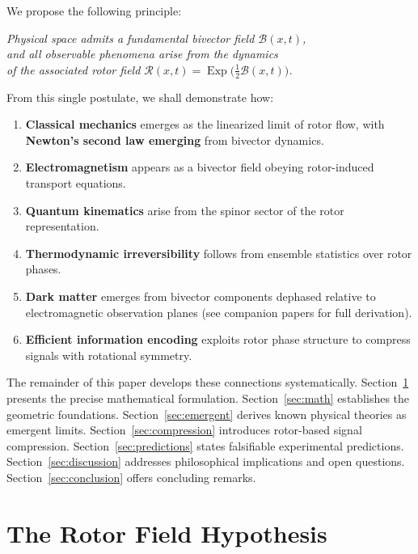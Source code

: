 \documentclass[11pt,a4paper]{article}
\newcommand{\Exp}{\operatorname{Exp}}
\newcommand{\Rotor}{\mathcal{R}}
\newcommand{\Biv}{\mathcal{B}}
\theoremstyle{definition}
\theoremstyle{plain}
\theoremstyle{remark}
\begin{document}
We propose the following principle:

\begin{center}
\textit{Physical space admits a fundamental bivector field $\Biv(x,t)$, \\
and all observable phenomena arise from the dynamics \\
of the associated rotor field $\Rotor(x,t)=\Exp\!\big(\tfrac{1}{2}\Biv(x,t)\big)$.}
\end{center}

From this single postulate, we shall demonstrate how:

\begin{enumerate}[leftmargin=*,itemsep=3pt]
  \item \textbf{Classical mechanics} emerges as the linearized limit of rotor flow, with \textbf{Newton's second law emerging} from bivector dynamics.
  \item \textbf{Electromagnetism} appears as a bivector field obeying rotor-induced transport equations.
  \item \textbf{Quantum kinematics} arise from the spinor sector of the rotor representation.
  \item \textbf{Thermodynamic irreversibility} follows from ensemble statistics over rotor phases.
  \item \textbf{Dark matter} emerges from bivector components dephased relative to electromagnetic observation planes (see companion papers for full derivation).
  \item \textbf{Efficient information encoding} exploits rotor phase structure to compress signals with rotational symmetry.
\end{enumerate}

The remainder of this paper develops these connections systematically. Section~\ref{sec:hypothesis} presents the precise mathematical formulation. Section~\ref{sec:math} establishes the geometric foundations. Section~\ref{sec:emergent} derives known physical theories as emergent limits. Section~\ref{sec:compression} introduces rotor-based signal compression. Section~\ref{sec:predictions} states falsifiable experimental predictions. Section~\ref{sec:discussion} addresses philosophical implications and open questions. Section~\ref{sec:conclusion} offers concluding remarks.

\vspace{1em}

\section{The Rotor Field Hypothesis}\label{sec:hypothesis}
\end{document}
